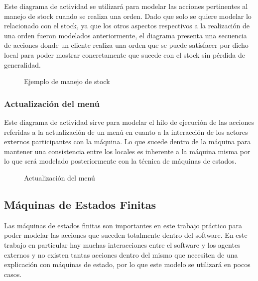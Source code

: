 \documentclass[a4paper,10pt]{article}
\begin{document}
Este diagrama de actividad se utilizar\'a para modelar las acciones pertinentes al manejo de stock cuando se realiza una orden. Dado que solo
se quiere modelar lo relacionado con el stock, ya que los otros aspectos respectivos a la realizaci\'on de una orden fueron modelados anteriormente,
el diagrama presenta una secuencia de acciones donde un cliente realiza una orden que se puede satisfacer por dicho local para poder mostrar concretamente
que sucede con el stock sin p\'erdida de generalidad.

\begin{figure}[H]
\centering
{}
\caption{Ejemplo de manejo de stock}
\end{figure}

\bigskip

\subsubsection*{Actualizaci\'on del men\'u}

Este diagrama de actividad sirve para modelar el hilo de ejecuci\'on de las acciones referidas a la actualizaci\'on de un men\'u en cuanto a la interacci\'on
de los actores externos participantes con la m\'aquina. Lo que sucede dentro de la m\'aquina para mantener una consistencia entre los locales es inherente
a la m\'aquina misma por lo que ser\'a modelado posteriormente con la t\'ecnica de m\'aquinas de estados.

\begin{figure}[H]
\centering
{}
\caption{Actualizaci\'on del men\'u}
\end{figure}


\bigskip

\subsection*{M\'aquinas de Estados Finitas}

Las m\'aquinas de estados finitas son importantes en este trabajo pr\'actico para poder modelar las acciones que suceden totalmente dentro del software. En este trabajo en particular hay muchas interacciones entre el software y los agentes externos y no existen tantas acciones dentro del mismo que necesiten de una explicaci\'on con m\'aquinas de estado, por lo que este modelo se utilizar\'a en pocos casos. 
\end{document}
